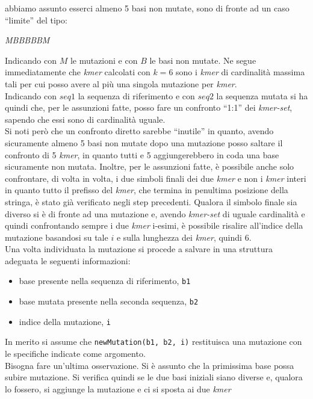 \documentclass[a4paper,12pt, oneside]{book}
\begin{document}
abbiamo assunto esserci almeno 5 basi non mutate, sono di fronte ad un caso
``limite'' del tipo:
\begin{center}
  \textit{{\color{red}M}BBBBB{\color{red}M}}
\end{center}
Indicando con $M$ le mutazioni e con $B$ le basi non mutate. Ne segue
immediatamente che \textit{kmer} calcolati con $k=6$ sono i \textit{kmer} di
cardinalità massima tali per cui posso avere al più una singola mutazione per
\textit{kmer}. \\
Indicando con $seq1$ la sequenza di riferimento e con $seq2$ la sequenza mutata
si ha quindi che, per le assunzioni fatte, posso fare un confronto ``1:1'' dei
\textit{kmer-set}, sapendo che essi sono di cardinalità uguale.\\
Si noti però che un confronto diretto sarebbe ``inutile'' in quanto, avendo
sicuramente almeno 5 basi non mutate dopo una mutazione posso saltare il
confronto di 5 \textit{kmer}, in quanto tutti e 5 aggiungerebbero in coda una
base sicuramente non mutata. Inoltre, per le assunzioni fatte, è possibile anche
solo confrontare, di volta in volta, i due simboli finali dei due \textit{kmer}
e non i \textit{kmer} interi in quanto tutto il prefisso del \textit{kmer}, che
termina in penultima posizione della stringa, è stato già verificato negli step
precedenti. Qualora il simbolo finale sia diverso si è di fronte ad una
mutazione e, avendo \textit{kmer-set} di uguale cardinalità e quindi
confrontando sempre i due \textit{kmer} i-esimi, è possibile risalire all'indice
della mutazione basandosi su tale $i$ e sulla lunghezza dei \textit{kmer},
quindi $6$.\\
Una volta individuata la mutazione si procede a salvare in una struttura
adeguata le seguenti informazioni:
\begin{itemize}
  \item base presente nella sequenza di riferimento, \texttt{b1}
  \item base mutata presente nella seconda sequenza, \texttt{b2}
  \item indice della mutazione, \texttt{i}
\end{itemize}
In merito si assume che \texttt{newMutation(b1, b2, i)} restituisca una
mutazione con le specifiche indicate come argomento.\\
Bisogna fare un'ultima osservazione. Si è assunto che la primissima base possa
subire mutazione. Si verifica quindi se le due basi iniziali siano diverse e,
qualora lo fossero, si aggiunge la mutazione e ci si sposta ai due \textit{kmer}
\end{document}
